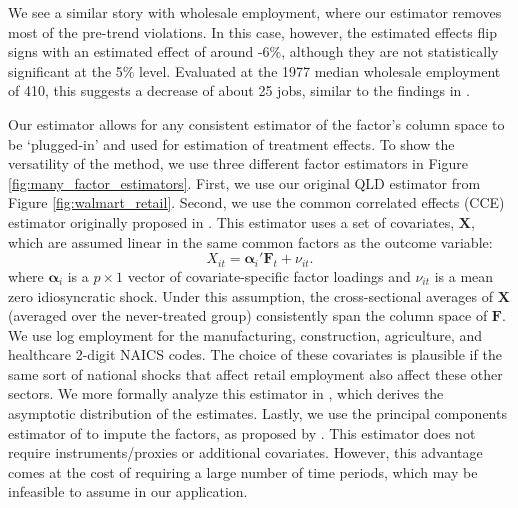 \documentclass[12pt]{article}
\begin{document}
We see a similar story with wholesale employment, where our estimator removes most of the pre-trend violations. In this case, however, the estimated effects flip signs with an estimated effect of around -6\%, although they are not statistically significant at the 5\% level. Evaluated at the 1977 median wholesale employment of 410, this suggests a decrease of about 25 jobs, similar to the findings in \citet{basker2005job}.

Our estimator allows for any consistent estimator of the factor's column space to be `plugged-in' and used for estimation of treatment effects. To show the versatility of the method, we use three different factor estimators in Figure \ref{fig:many_factor_estimators}. First, we use our original QLD estimator from Figure \ref{fig:walmart_retail}. Second, we use the common correlated effects (CCE) estimator originally proposed in \citet{pesaran2006estimation}. This estimator uses a set of covariates, $\bm X$, which are assumed linear in the same common factors as the outcome variable:
\begin{equation}
  X_{it} = \bm\alpha_i' \bm{F}_t + \nu_{it}.
\end{equation}
where $\bm \alpha_i$ is a $p \times 1$ vector of covariate-specific factor loadings and $\nu_{it}$ is a mean zero idiosyncratic shock. Under this assumption, the cross-sectional averages of $\bm X$ (averaged over the never-treated group) consistently span the column space of $\bm{F}$. We use log employment for the manufacturing, construction, agriculture, and healthcare 2-digit NAICS codes. The choice of these covariates is plausible if the same sort of national shocks that affect retail employment also affect these other sectors. We more formally analyze this estimator in \citet{Brown_Butts_Westerlund_2023}, which derives the asymptotic distribution of the estimates. Lastly, we use the principal components estimator of \citet{Bai_2009} to impute the factors, as proposed by \citet{xu2017generalized}. This estimator does not require instruments/proxies or additional covariates. However, this advantage comes at the cost of requiring a large number of time periods, which may be infeasible to assume in our application.
\end{document}
